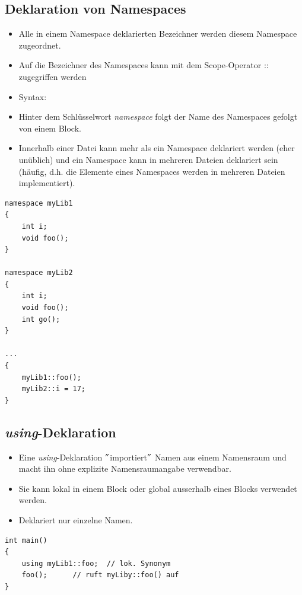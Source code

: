 \subsection{Deklaration von Namespaces}
\vspace{-\baselineskip}
\begin{minipage}{0.7\linewidth}
	\begin{itemize}
		\item Alle in einem Namespace deklarierten Bezeichner werden diesem Namespace zugeordnet.
		\item Auf die Bezeichner des Namespaces kann mit dem Scope-Operator :: zugegriffen werden
		\item Syntax:
		\item[\-] Hinter dem Schlüsselwort \emph{namespace} folgt der Name des Namespaces gefolgt von einem Block.
		\item Innerhalb einer Datei kann mehr als ein Namespace deklariert werden (eher unüblich) und ein Namespace kann in mehreren Dateien deklariert sein (häufig, d.h. die Elemente eines Namespaces werden in mehreren Dateien implementiert).
	\end{itemize}
\end{minipage}%
\hspace{0.04\linewidth}
\begin{minipage}{0.25\linewidth}
\begin{lstlisting}
namespace myLib1
{
	int i;
	void foo();
}
	
namespace myLib2
{
	int i;
	void foo();
	int go();
}
	
...
{
	myLib1::foo();
	myLib2::i = 17;
}
\end{lstlisting}
\end{minipage}

\subsection{\emph{using}-Deklaration}
\vspace{-\baselineskip}
\begin{minipage}{0.5\linewidth}
\begin{itemize}
	\item Eine \emph{using}-Deklaration $"$importiert$"$ Namen aus einem Namensraum und macht ihn ohne explizite Namensraumangabe verwendbar.
	\item Sie kann lokal in einem Block oder global ausserhalb eines Blocks verwendet werden.
	\item Deklariert nur einzelne Namen.
\end{itemize}
\end{minipage}
\vspace{-\baselineskip}
\hspace{0.04\linewidth}
\begin{minipage}{0.45\linewidth}
\begin{lstlisting}
int main()
{
	using myLib1::foo;	// lok. Synonym
	foo();		// ruft myLiby::foo() auf
}
\end{lstlisting}
\end{minipage}

